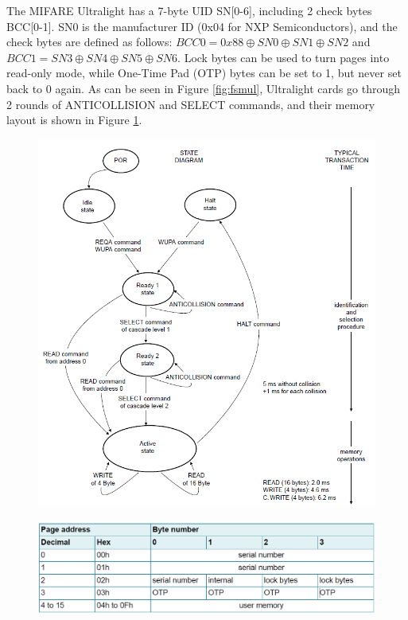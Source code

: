 \documentclass[fleqn,10pt]{SelfArx} %
\begin{document}
The MIFARE Ultralight has a 7-byte UID SN[0-6], including 2 check bytes BCC[0-1]. SN0 is the manufacturer ID (0x04 for NXP Semiconductors), and the check bytes are defined as follows: $BCC0=0x88 \oplus SN0 \oplus SN1 \oplus SN2$ and $BCC1 = SN3 \oplus SN4 \oplus SN5 \oplus SN6$. Lock bytes can be used to turn pages into read-only mode, while One-Time Pad (OTP) bytes can be set to 1, but never set back to 0 again. As can be seen in Figure \ref{fig:fsmul}, Ultralight cards go through 2 rounds of ANTICOLLISION and SELECT commands, and their memory layout is shown in Figure \ref{fig:memul}.


\begin{figure}[h]
\centering
\begin{minipage}[b]{.47\textwidth}
  \centering
  \includegraphics[width=\textwidth]{img/fsmul}
  \label{fig:fsmul}
\end{minipage}
\begin{minipage}[b]{.47\textwidth}
  \centering
  \includegraphics[width=\textwidth]{img/memul}
  \label{fig:memul}
\end{minipage}
\end{figure}
\end{document}
